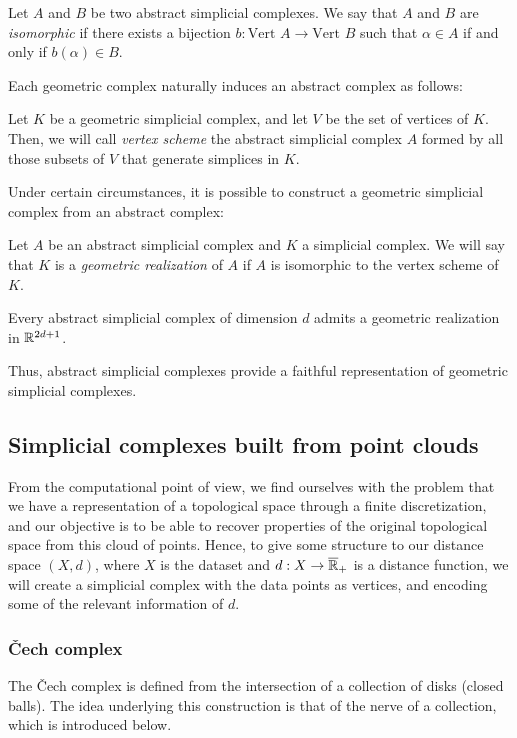 \documentclass[../main.tex]{subfiles}
\begin{document}
\begin{definition}
Let $A$ and $B$ be two abstract simplicial complexes. We say that $A$ and $B$ are \emph{isomorphic} if there exists a bijection $b:\text{Vert }A \to \text{Vert }B$ such that $\alpha \in A$ if and only if $b(\alpha) \in B$.
\end{definition}

Each geometric complex naturally induces an abstract complex as follows:
\begin{definition}
Let $K$ be a geometric simplicial complex, and let $V$ be the set of vertices of $K$. Then, we will call \emph{vertex scheme} the abstract simplicial complex $A$ formed by all those subsets of $V$ that generate simplices in $K$.
\end{definition}

Under certain circumstances, it is possible to construct a geometric simplicial complex from an abstract complex:
\begin{definition}
Let $A$ be an abstract simplicial complex and $K$ a simplicial complex. We will say that $K$ is a \emph{geometric realization} of $A$ if $A$ is isomorphic to the vertex scheme of $K$.
\end{definition}

\begin{theorem}
Every abstract simplicial complex of dimension $d$ admits a geometric realization in $\mathbb{R}^{2d + 1}$.
\end{theorem}

Thus, abstract simplicial complexes provide a faithful representation of geometric simplicial complexes.

\subsection{Simplicial complexes built from point clouds}
From the computational point of view, we find ourselves with the problem that we have a representation of a topological space through a finite discretization, and our objective is to be able to recover properties of the original topological space from this cloud of points. Hence, to give some structure to our distance space $(X,d)$, where $X$ is the dataset and $d: X \to \overline{\mathbb{R}}_+$ is a distance function, we will create a simplicial complex with the data points as vertices, and encoding some of the relevant information of $d$.

\subsubsection*{\v{C}ech complex}
The \v{C}ech complex is defined from the intersection of a collection of disks (closed balls). The idea underlying this construction is that of the nerve of a collection, which is introduced below.
\end{document}
